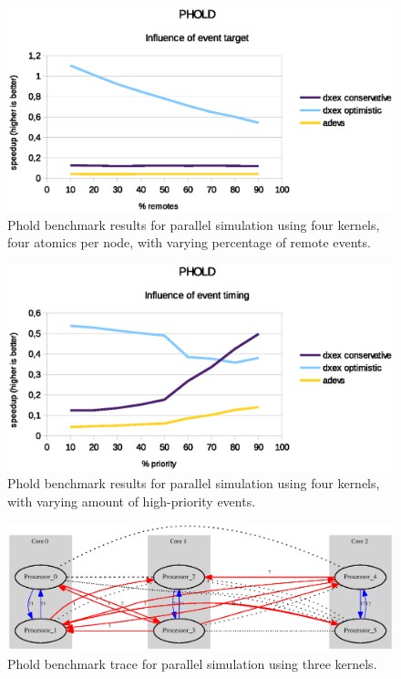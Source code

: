 \begin{figure}
    \center
    \includegraphics[width=\plotfraction\columnwidth]{fig/phold_remotes.eps}
    \caption{Phold benchmark results for parallel simulation using four kernels, four atomics per node, with varying percentage of remote events.}
\end{figure}
\begin{figure}
	\center
	\includegraphics[width=\plotfraction\columnwidth]{fig/phold_priority.eps}
	\caption{Phold benchmark results for parallel simulation using four kernels, with varying amount of high-priority events.}
	\label{fig:phold_priority}
\end{figure}
\begin{figure}
	\center
	\includegraphics[width=\plotfraction\columnwidth]{fig/phold_parallel_allocation.eps}
	\caption{Phold benchmark trace for parallel simulation using three kernels.}
	\label{fig:phold_allocation}
\end{figure}

